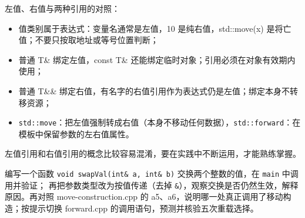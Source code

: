 \begin{conclusion}
左值、右值与两种引用的对照：

\begin{itemize}
\item 值类别属于表达式：变量名通常是左值，10 是纯右值，std::move(x) 是将亡值；不要只按取地址或等号位置判断；
\item 普通 T\& 绑定左值，const T\& 还能绑定临时对象；引用必须在对象有效期内使用；
\item 普通 T\&\& 绑定右值，有名字的右值引用作为表达式仍是左值；绑定本身不转移资源；
\item \texttt{std::move}：把左值强制转成右值（本身不移动任何数据），\texttt{std::forward}：在模板中保留参数的左右值属性。
\end{itemize}
\end{conclusion}

左值引用和右值引用的概念比较容易混淆，要在实践中不断运用，才能熟练掌握。

\begin{exercise}\label{ex:v1-cpp-reference}

编写一个函数 \texttt{void swapVal(int\& a, int\& b)} 交换两个整数的值，在 \texttt{main} 中调用并验证；
再把参数类型改为按值传递（去掉 \texttt{\&}），观察交换是否仍然生效，解释原因。再对照 move-construction.cpp 的 a5、a6，说明哪一处真正调用了移动构造；按提示切换 forward.cpp 的调用语句，预测并核验五次重载选择。
\end{exercise}
